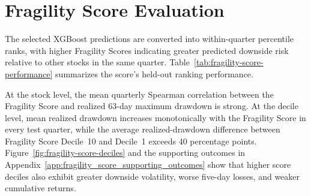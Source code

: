 \section{Fragility Score Evaluation}
\label{sec:fragility_statistical_evaluation}

The selected XGBoost predictions are converted into within-quarter percentile ranks, with higher Fragility Scores indicating greater predicted downside risk relative to other stocks in the same quarter. Table~\ref{tab:fragility-score-performance} summarizes the score's held-out ranking performance.



\noindent
At the stock level, the mean quarterly Spearman correlation between the Fragility Score and realized 63-day maximum drawdown is strong. At the decile level, mean realized drawdown increases monotonically with the Fragility Score in every test quarter, while the average realized-drawdown difference between Fragility Score Decile~10 and Decile~1 exceeds 40 percentage points. Figure~\ref{fig:fragility-score-deciles} and the supporting outcomes in Appendix~\ref{app:fragility_score_supporting_outcomes} show that higher score deciles also exhibit greater downside volatility, worse five-day losses, and weaker cumulative returns.
